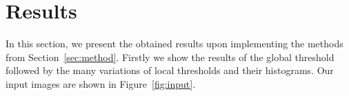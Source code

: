\documentclass[conference]{IEEEtran}
\begin{document}
\section{Results}
\label{sec:result}
In this section, we present the obtained results upon implementing the methods from Section~\ref{sec:method}. Firstly we show the results of the global threshold followed by the many variations of local thresholds and their histograms. Our input images are shown in Figure~\ref{fig:input}.
\begin{figure}[htbp]
\centering
{}
\quad
{}
\end{figure}
\end{document}
